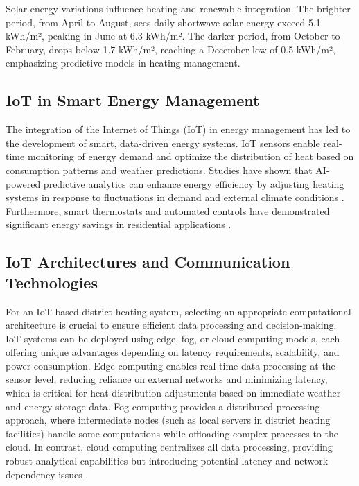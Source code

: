 \documentclass[conference]{IEEEtran}
\begin{document}
Solar energy variations influence heating and renewable integration. The brighter period, from April to August, sees daily shortwave solar energy exceed 5.1 kWh/m², peaking in June at 6.3 kWh/m². The darker period, from October to February, drops below 1.7 kWh/m², reaching a December low of 0.5 kWh/m², emphasizing predictive models in heating management. \cite{weatherspark_assen}


\subsection{IoT in Smart Energy Management}
The integration of the Internet of Things (IoT) in energy management has led to the development of smart, data-driven energy systems. IoT sensors enable real-time monitoring of energy demand and optimize the distribution of heat based on consumption patterns and weather predictions\cite{smarthome_iot_big_data}. Studies have shown that AI-powered predictive analytics can enhance energy efficiency by adjusting heating systems in response to fluctuations in demand and external climate conditions \cite{ai_energy}. Furthermore, smart thermostats and automated controls have demonstrated significant energy savings in residential applications \cite{smart_heating}.

\subsection{IoT Architectures and Communication Technologies}

For an IoT-based district heating system, selecting an appropriate computational architecture is crucial to ensure efficient data processing and decision-making. IoT systems can be deployed using edge, fog, or cloud computing models\cite{s21175922}, each offering unique advantages depending on latency requirements, scalability, and power consumption. Edge computing enables real-time data processing at the sensor level, reducing reliance on external networks and minimizing latency, which is critical for heat distribution adjustments based on immediate weather and energy storage data. Fog computing provides a distributed processing approach, where intermediate nodes (such as local servers in district heating facilities) handle some computations while offloading complex processes to the cloud. In contrast, cloud computing centralizes all data processing, providing robust analytical capabilities but introducing potential latency and network dependency issues \cite{iot_architecture}. 
\end{document}
